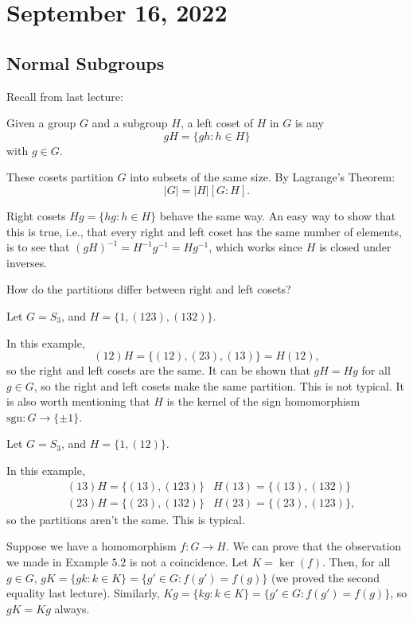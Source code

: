 \section{September 16, 2022}

\subsection{Normal Subgroups}

Recall from last lecture: 

\begin{definition}

Given a group $G$ and a subgroup $H$, a left coset of $H$ in $G$ is any
\[gH = \{gh : h\in H\}\]
with $g\in G$. 
\end{definition}

These cosets partition $G$ into subsets of the same size. By Lagrange's Theorem:
\[\vert G\vert  = \vert H\vert [G:H].\]

Right cosets $Hg=\{hg : h\in H\}$ behave the same way. An easy way to show that this is true, i.e., that every right and left coset has the same number of elements, is to see that $(gH)^{-1} = H^{-1}g^{-1}=Hg^{-1}$, which works since $H$ is closed under inverses. 

How do the partitions differ between right and left cosets?

\begin{example}
\exlabel

Let $G=S_3$, and $H = \{1,(123),(132)\}$. 
\end{example}
In this example, 
\[(1 2)H = \{(12),(23),(13)\} = H(1 2),\]
so the right and left cosets are the same. It can be shown that $gH=Hg$ for all $g\in G$, so the right and left cosets make the same partition. This is not typical. It is also worth mentioning that $H$ is the kernel of the sign homomorphism $\text{sgn}: G\rightarrow \{\pm 1\}$.

\begin{example}
\exlabel

Let $G=S_3$, and $H = \{1, (12)\}$.
\end{example}
In this example,
\begin{align*}
    & (13)H = \{(13), (123)\} & H(13) = \{(13),(132)\} \\
    & (23)H = \{(23), (132)\} & H(23) = \{(23), (123)\},
\end{align*}
so the partitions aren't the same. This is typical. 

Suppose we have a homomorphism $f:G\rightarrow H$. We can prove that the observation we made in Example $5.2$ is not a coincidence. Let $K = \ker(f)$. Then, for all $g\in G$, $gK = \{gk : k\in K\} = \{g'\in G : f(g')=f(g)\}$ (we proved the second equality last lecture). Similarly, $Kg = \{kg : k\in K\} = \{g'\in G : f(g')=f(g)\}$, so $gK=Kg$ always. 

